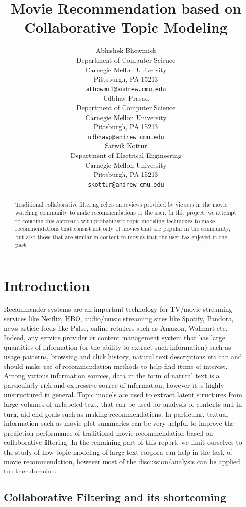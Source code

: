 \documentclass{article} %
\title{Movie Recommendation based on Collaborative Topic Modeling}
\author{
Abhishek Bhowmick \\
Department of Computer Science\\
Carnegie Mellon University\\
Pittsburgh, PA 15213 \\
\texttt{abhowmi1@andrew.cmu.edu} \\
\And
Udbhav Prasad \\
Department of Computer Science\\
Carnegie Mellon University\\
Pittsburgh, PA 15213 \\
\texttt{udbhavp@andrew.cmu.edu} \\
\And
Satwik Kottur \\
Department of Electrical Engineering\\
Carnegie Mellon University\\
Pittsburgh, PA 15213 \\
\texttt{skottur@andrew.cmu.edu} \\
}
\begin{document}
\maketitle

\begin{abstract}
Traditional collaborative filtering relies on reviews provided by viewers
in the movie watching community to make recommendations to the user. In this
project, we attempt to combine this approach with probabilistic topic modeling
techniques to make recommendations that consist not only of movies that are
popular in the community, but also those that are similar in content to movies
that the user has enjoyed in the past.  
\end{abstract}

\section{Introduction}

Recommender systems are an important technology for TV/movie streaming
services like Netflix, HBO, audio/music streaming sites like Spotify, 
Pandora, news article feeds like Pulse, online retailers such as Amazon, Walmart
etc. Indeed, any service provider or content management system that has large
quantities of information (or the ability to extract such information) such as 
usage patterns, browsing and click history, natural text descriptions etc can
and should make use of recommendation methods to help find items of interest. 
Among various information sources, data in the form of natural text is a 
particularly rich and expressive source of information, however it is highly 
unstructured in general. Topic models are used to extract latent structures
from large volumes of unlabeled text, that can be used for analysis of 
contents and in turn, aid end goals such as making recommendations. In
particular, textual information such as movie plot summaries can be very
helpful to improve the prediction performance of traditional movie
recommendation based on collaborative filtering. In the remaining 
part of this report, we limit ourselves to the study of how topic modeling of 
large text corpora can help in the task of movie recommendation, however most 
of the discussion/analysis can be applied to other domains.  

\subsection{Collaborative Filtering and its shortcoming}
\end{document}
